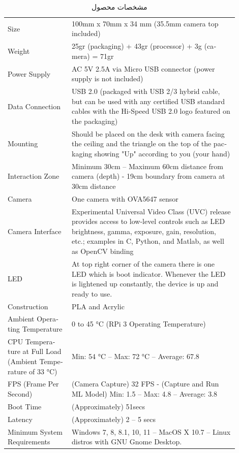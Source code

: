 \documentclass{article}
\begin{document}
\begin{table}[]
\begin{latin}
\begin{tabular}{|p{0.25\linewidth}|p{0.65\linewidth}|}
\hline
\rowcolor[HTML]{A5A5A5} 
 &
   \\ \hline
\rowcolor[HTML]{EDEDED} 
Size &
  100mm x 70mm x 34 mm (35.5mm camera top included) \\ \hline
Weight &
  25gr (packaging) + 43gr (processor) + 3g (camera)   = 71gr \\ \hline
\rowcolor[HTML]{EDEDED} 
Power Supply &
  AC 5V 2.5A via Micro USB connector (power supply is   not included) \\ \hline
Data   Connection &
  USB 2.0 (packaged with USB 2/3 hybrid   cable, but can be used with any certified USB standard cables with the   Hi-Speed USB 2.0 logo featured on the packaging) \\ \hline
\rowcolor[HTML]{EDEDED} 
Mounting &
  Should be placed on the desk with camera facing the   ceiling and the triangle on the top of the packaging showing "Up"   according to you (your hand) \\ \hline
Interaction   Zone &
  Minimum 30cm – Maximum 60cm distance from camera (depth) - 19cm boundary from camera at 30cm distance\\ \hline
\rowcolor[HTML]{EDEDED} 
Camera &
  One camera with OVA5647 sensor \\ \hline
Camera   Interface &
  Experimental Universal Video Class (UVC)   release provides access to low-level controls such as LED brightness, gamma,   exposure, gain, resolution, etc.; examples in C, Python, and Matlab, as well   as OpenCV binding \\ \hline
\rowcolor[HTML]{EDEDED} 
LED &
  At top right corner of the camera there is one LED   which is boot indicator. Whenever the LED is lightened up constantly, the device   is up and ready to use. \\ \hline
Construction &
  PLA and Acrylic \\ \hline
\rowcolor[HTML]{EDEDED} 
Ambient Operating Temperature &
  0 to 45 °C (RPi 3 Operating Temperature) \\ \hline
CPU   Temperature at Full Load (Ambient Temperature of 33 °C) &
  Min:   54 °C – Max: 72 °C – Average: 67.8 \\ \hline
\rowcolor[HTML]{EDEDED} 
FPS (Frame Per Second) &
  (Camera Capture) 32 FPS - (Capture and Run ML Model) Min: 1.5 – Max: 4.8 –   Average: 3.8 \\ \hline
Boot   Time &
  (Approximately) 51secs \\ \hline
\rowcolor[HTML]{EDEDED} 
Latency &
  (Approximately) 2 – 5 secs \\ \hline
Minimum   System Requirements &
  Windows 7, 8, 8.1, 10, 11 – MacOS X 10.7 – Linux   distros with GNU Gnome Desktop. \\ \hline
\end{tabular}
\end{latin}
\caption{مشخصات محصول}
\label{spec}
\end{table}
\end{document}

